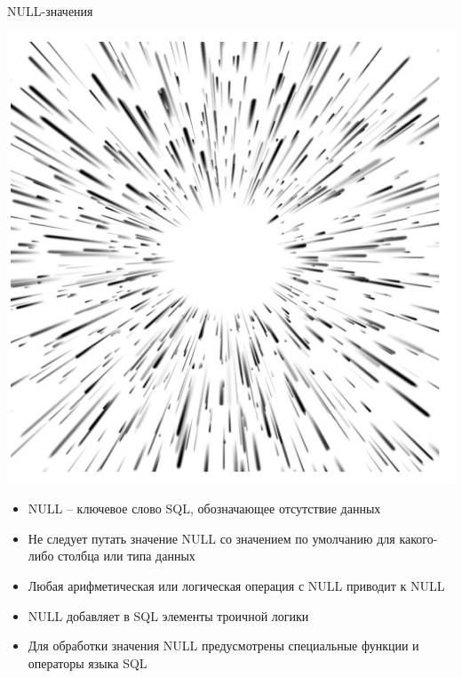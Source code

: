 \documentclass{beamer}
\begin{document}
\begin{frame}{NULL-значения}
	\begin{minipage}{0.3\textwidth}
		\begin{flushleft}
			\begin{center}
				\includegraphics[scale=0.3]{images/NULL.png}
			\end{center}
		\end{flushleft}
	\end{minipage}
	\begin{minipage}{0.6\textwidth}
		\begin{flushright}
			\begin{itemize}
				\item NULL – ключевое слово SQL, обозначающее отсутствие данных
				\item Не следует путать значение NULL со значением по умолчанию для какого-либо столбца или типа данных
				\item Любая арифметическая или логическая операция с NULL приводит к NULL
				\item NULL добавляет в SQL элементы троичной логики
				\item Для обработки значения NULL предусмотрены специальные функции и операторы языка SQL
			\end{itemize}
		\end{flushright}
	\end{minipage}
\end{frame}
\end{document}
